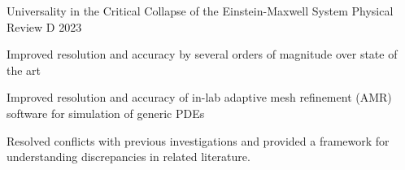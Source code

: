 
\begin{cventries}
    
    
    \cventrythree
    {Universality in the Critical Collapse of the Einstein-Maxwell System} %
    {} %
    {Physical Review D} %
    {2023} %
    {\begin{cvitems} %
        \item Improved resolution and accuracy by several orders of magnitude over state of the art
        \item Improved resolution and accuracy of in-lab adaptive mesh refinement (AMR) software for simulation of generic PDEs
        \item Resolved conflicts with previous investigations and provided a framework for understanding discrepancies in related literature.
    \end{cvitems}}


\end{cventries}
